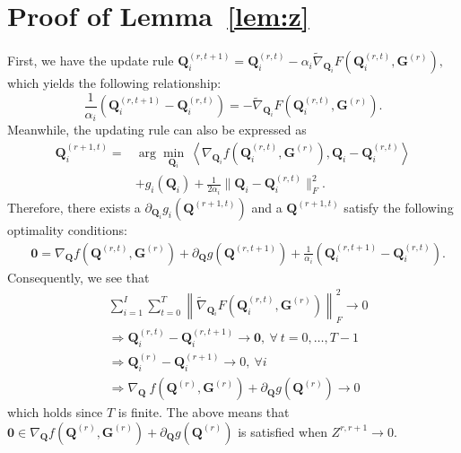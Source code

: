 \documentclass[10pt,journal]{IEEEtran}
\newcommand{\G}{\boldsymbol{G}}
\newcommand{\Q}{\boldsymbol{Q}}
\begin{document}
\section{Proof of Lemma~\ref{lem:z}}\label{app:lemma_z}
First, we have the update rule
$\Q_i^{(r,t+1)} = \Q_i^{(r,t)}-\alpha_i\tilde{\nabla}_{\Q_i}F(\Q_i^{(r,t)},\G^{(r)}),$
which yields the following relationship:
\begin{equation}\label{eq:q_norm}
\frac{1}{\alpha_i}(\Q_i^{(r,t+1)} - \Q_i^{(r,t)} )= -\tilde{\nabla}_{\Q_i}F(\Q_i^{(r,t)},\G^{(r)}).
\end{equation}
Meanwhile, the updating rule can also be expressed as
\begin{align}
\Q_i^{(r+1,t)} = &\arg\min_{\Q_i}~ \left<\nabla_{\Q_i}f(\Q_i^{(r,t)},\G^{(r)}),\Q_i -\Q_i^{(r,t)}\right> \nonumber\\
     & +g_i(\Q_i)+\frac{1}{2\alpha_i}\|\Q_i-\Q_i^{(r,t)}\|_F^2.  \label{eq:q_arg}
\end{align}
Therefore, 
there exists a $\partial_{\Q_i}g_i(\Q^{(r+1,t)})$ and a $\Q^{(r+1,t)}$ satisfy the following optimality conditions:
\begin{align*}
&{\bm 0} = \nabla_{\Q}f(\Q^{(r,t)},\G^{(r)}) + \partial_{\Q}g(\Q^{(r,t+1)})+\frac{1}{\alpha_i}(\Q_i^{(r,t+1)}-\Q_i^{(r,t)}).
\end{align*}
Consequently, we see that
\begin{align*}
&\sum_{i=1}^I\sum_{t=0}^T\left\|\tilde{\nabla}_{\Q_i}F(\Q_i^{(r,t)},\G^{(r)})\right\|_F^2\rightarrow 0 \\
&\Rightarrow \Q_i^{(r,t)}-\Q_i^{(r,t+1)} \rightarrow {\bm 0},~\forall~t=0,\ldots,T-1\\
&\Rightarrow \Q_i^{(r)}-\Q_i^{(r+1)} \rightarrow 0,~\forall i\\
&\Rightarrow \nabla_{\Q}~f\left(\Q^{(r)},\G^{(r)}\right) + \partial_{\Q} g\left(\Q^{(r)}\right)  \rightarrow 0 \nonumber
\end{align*}
which holds since $T$ is finite.
The above means that 
${\bm 0}\in \nabla_{\Q}f(\Q^{(r)},\G^{(r)}) + \partial_{\Q}g(\Q^{(r)})$
is satisfied when $Z^{r,r+1}\rightarrow 0$.
\end{document}
